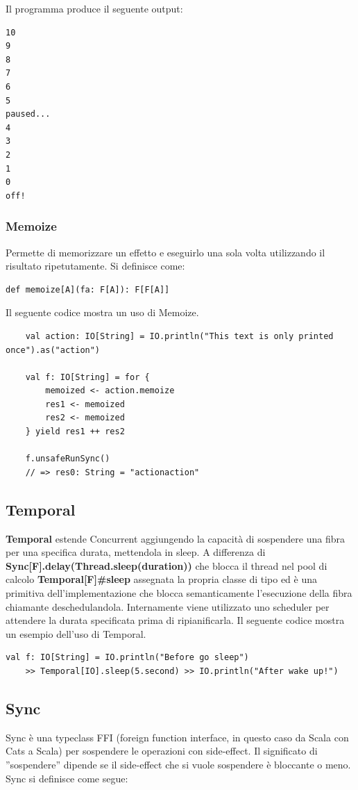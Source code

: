 Il programma produce il seguente output:
\begin{verbatim}
10
9
8
7
6
5
paused...
4
3
2
1
0
off!
\end{verbatim}

\subsubsection{Memoize}
Permette di memorizzare un effetto e eseguirlo una sola volta utilizzando il risultato ripetutamente. Si definisce come:
\begin{verbatim}
def memoize[A](fa: F[A]): F[F[A]]    
\end{verbatim}
Il seguente codice mostra un uso di Memoize.
\begin{verbatim}
    val action: IO[String] = IO.println("This text is only printed once").as("action")

    val f: IO[String] = for {
        memoized <- action.memoize
        res1 <- memoized
        res2 <- memoized
    } yield res1 ++ res2

    f.unsafeRunSync()
    // => res0: String = "actionaction"
\end{verbatim}
\subsection{Temporal}
\textbf{Temporal} estende Concurrent aggiungendo la capacità di sospendere una fibra per una specifica durata, mettendola in sleep. A differenza di \textbf{Sync[F].delay(Thread.sleep(duration))} che blocca il thread nel pool di calcolo \textbf{Temporal[F]\#sleep} assegnata la propria classe di tipo ed è una primitiva dell'implementazione che blocca semanticamente l'esecuzione della fibra chiamante deschedulandola. Internamente viene utilizzato uno scheduler per attendere la durata specificata prima di ripianificarla. Il seguente codice mostra un esempio dell'uso di Temporal.

\begin{verbatim}
val f: IO[String] = IO.println("Before go sleep")
    >> Temporal[IO].sleep(5.second) >> IO.println("After wake up!")
\end{verbatim}


\subsection{Sync}
Sync è una typeclass FFI (foreign function interface, in questo caso da Scala con Cats a Scala) per sospendere le operazioni con side-effect. Il significato di ”sospendere” dipende se il side-effect che si vuole sospendere è bloccante o meno. Sync si definisce come segue:

